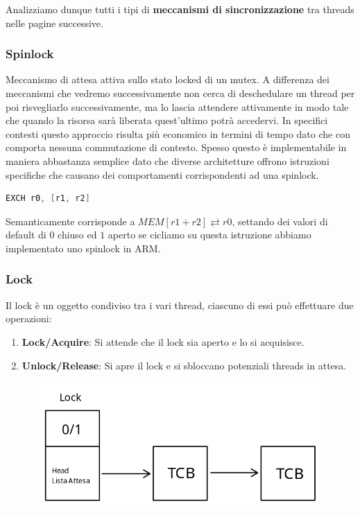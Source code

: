 \documentclass{article}
\begin{document}
Analizziamo dunque tutti i tipi di \textbf{meccanismi di sincronizzazione} tra threads nelle pagine successive.

\subsubsection{Spinlock}

Meccanismo di attesa attiva sullo stato locked di un mutex. A differenza dei meccanismi che vedremo successivamente
non cerca di deschedulare un thread per poi risvegliarlo successivamente, ma lo lascia attendere attivamente in modo tale che
quando la risorsa sarà liberata quest'ultimo potrà accedervi. In specifici contesti questo approccio risulta più economico in termini di tempo
dato che con comporta nessuna commutazione di contesto. Spesso questo è implementabile in maniera abbastanza semplice dato che diverse architetture offrono
istruzioni specifiche che causano dei comportamenti corrispondenti ad una spinlock.

\vspace*{5px}

\begin{lstlisting}[language = C]
    EXCH r0, [r1, r2]
\end{lstlisting}

\vspace*{-8px}

Semanticamente corrisponde a $ MEM[r1+r2] \rightleftarrows r0 $, settando dei valori di default di $0$ chiuso ed $1$ aperto se cicliamo su questa istruzione abbiamo implementato uno spinlock in ARM.

\newpage

\subsubsection{Lock}

Il lock è un oggetto condiviso tra i vari thread, ciascuno di essi può effettuare due operazioni:

\begin{enumerate}
    \item \textbf{Lock/Acquire}: Si attende che il lock sia aperto e lo si acquisisce.
    \item \textbf{Unlock/Release}: Si apre il lock e si sbloccano potenziali threads in attesa.
\end{enumerate}

\begin{figure}[htbp]
    \center
    \includegraphics[scale=0.325]{img/rappresentazione_lock.png}
\end{figure}
\end{document}
